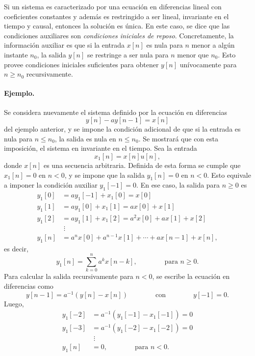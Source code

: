 \documentclass[a4paper]{report}
\begin{document}
Si un sistema es caracterizado por una ecuación en diferencias lineal con coeficientes constantes y además es restringido a ser lineal, invariante en el tiempo y causal, entonces la solución es única. En este caso, se dice que las condiciones auxiliares son \emph{condiciones iniciales de reposo}. Concretamente, la información auxiliar es que si la entrada \(x[n]\) es nula para \(n\) menor a algún instante \(n_0\), la salida \(y[n]\) se restringe a ser nula para \(n\) menor que \(n_0\). Esto provee condiciones iniciales suficientes para obtener \(y[n]\) unívocamente para \(n\geq n_0\) recursivamente.
 
\paragraph{Ejemplo.} Se considera nuevamente el sistema definido por la ecuación en diferencias
\[
 y[n]-ay[n-1]=x[n]
\]
del ejemplo anterior, y se impone la condición adicional de que si la entrada es nula para \(n\leq n_0\), la salida es nula en \(n\leq n_0\). Se mostrará que con esta imposición, el sistema en invariante en el tiempo. Sea la entrada
\[
 x_1[n]=x[n]u[n],
\]
donde \(x[n]\) es una secuencia arbitraria. Definida de esta forma se cumple que \(x_1[n]=0\) en \(n<0\), y se impone que la salida \(y_1[n]=0\) en \(n<0\). Esto equivale a imponer la condición auxiliar \(y_1[-1]=0\). En ese caso, la salida para \(n\geq0\) es
\begin{align*}
  y_1[0]&=ay_1[-1]+x_1[0]=x[0]\\
  y_1[1]&=ay_1[0]+x_1[1]=ax[0]+x[1]\\
  y_1[2]&=ay_1[1]+x_1[2]=a^2x[0]+ax[1]+x[2]\\
  &\;\vdots\\
  y_1[n]&=a^{n}x[0]+a^{n-1}x[1]+\cdots+ax[n-1]+x[n],
\end{align*}
es decir,
\begin{equation}\label{eq:seq_and_sys_exercise_2_51_ext_output}
 y_1[n]=\sum_{k=0}^{n}a^kx[n-k],
 \qquad\qquad\textrm{para }n\geq0. 
\end{equation}
Para calcular la salida recursivamente para \(n<0\), se escribe la ecuación en diferencias como
\[
 y[n-1]=a^{-1}(y[n]-x[n])
 \qquad\qquad\textrm{con}\qquad\qquad
 y[-1]=0.
\]
Luego,
\begin{align*}
  y_1[-2]&=a^{-1}(y_1[-1]-x_1[-1])=0\\
  y_1[-3]&=a^{-1}(y_1[-2]-x_1[-2])=0\\
  &\;\vdots\\
  y_1[n]&=0,
  \qquad\qquad\textrm{para }n<0.
\end{align*}
\end{document}
